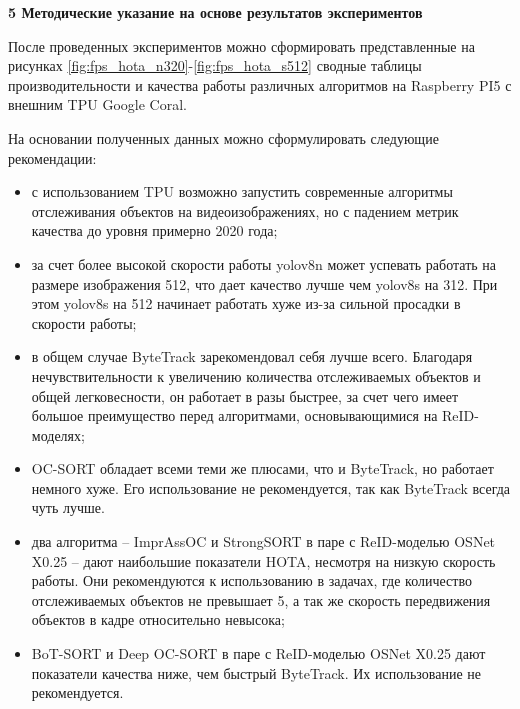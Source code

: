 \newpage
\begin{center}
  \textbf{\large 5 Методические указание на основе результатов экспериментов}
\end{center}
После проведенных экспериментов можно сформировать представленные на рисунках \ref{fig:fps_hota_n320}-\ref{fig:fps_hota_s512} сводные таблицы производительности и качества работы различных алгоритмов на Raspberry PI5 с внешним TPU Google Coral.

На основании полученных данных можно сформулировать следующие рекомендации:
\begin{itemize}
  \item с использованием TPU возможно запустить современные алгоритмы отслеживания объектов на видеоизображениях, но с падением метрик качества до уровня примерно 2020 года;
  \item за счет более высокой скорости работы yolov8n может успевать работать на размере изображения 512, что дает качество лучше чем yolov8s на 312. При этом yolov8s на 512 начинает работать хуже из-за сильной просадки в скорости работы;
  \item в общем случае ByteTrack зарекомендовал себя лучше всего. Благодаря нечувствительности к увеличению количества отслеживаемых объектов и общей легковесности, он работает в разы быстрее, за счет чего имеет большое преимущество перед алгоритмами, основывающимися на ReID-моделях; 
  \item OC-SORT обладает всеми теми же плюсами, что и ByteTrack, но работает немного хуже. Его использование не рекомендуется, так как ByteTrack всегда чуть лучше.
  \item два алгоритма -- ImprAssOC и StrongSORT в паре с ReID-моделью OSNet X0.25 -- дают наибольшие показатели HOTA, несмотря на низкую скорость работы. Они рекомендуются к использованию в задачах, где количество отслеживаемых объектов не превышает 5, а так же скорость передвижения объектов в кадре относительно невысока;
  \item BoT-SORT и Deep OC-SORT в паре с ReID-моделью OSNet X0.25 дают показатели качества ниже, чем быстрый ByteTrack. Их использование не рекомендуется.
\end{itemize}




